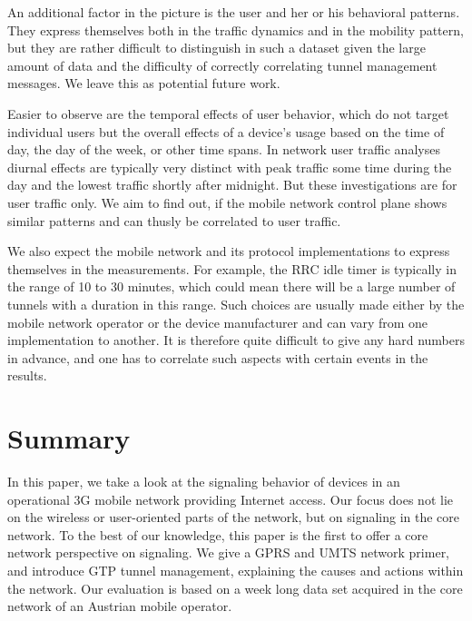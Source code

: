 An additional factor in the picture is the user and her or his behavioral patterns. They express themselves both in the traffic dynamics and in the mobility pattern, but they are rather difficult to distinguish in such a dataset given the large amount of data and the difficulty of correctly correlating tunnel management messages. We leave this as potential future work.

Easier to observe are the temporal effects of user behavior, which do not target individual users but the overall effects of a device's usage based on the time of day, the day of the week, or other time spans. In network user traffic analyses diurnal effects are typically very distinct with peak traffic some time during the day and the lowest traffic shortly after midnight. But these investigations are for user traffic only. We aim to find out, if the mobile network control plane shows similar patterns and can thusly be correlated to user traffic.

We also expect the mobile network and its protocol implementations to express themselves in the measurements. For example, the \gls{RRC} idle timer is typically in the range of 10 to 30 minutes, which could mean there will be a large number of tunnels with a duration in this range. Such choices are usually made either by the mobile network operator or the device manufacturer and can vary from one implementation to another. It is therefore quite difficult to give any hard numbers in advance, and one has to correlate such aspects with certain events in the results.















\section{Summary}
\label{c4:sec:conclusion}
In this paper, we take a look at the signaling behavior of devices in an operational \gls{3G} mobile network providing Internet access. Our focus does not lie on the wireless or user-oriented parts of the network, but on signaling in the core network. To the best of our knowledge, this paper is the first to offer a core network perspective on signaling. We give a \gls{GPRS} and \gls{UMTS} network primer, and introduce \gls{GTP} tunnel management, explaining the causes and actions within the network. Our evaluation is based on a week long data set acquired in the core network of an Austrian mobile operator.

